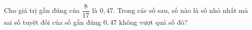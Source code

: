 \begin{ex}
Cho giá trị gần đúng của $\dfrac{8}{17}$ là $0{,}47$. Trong các số sau, số nào là số nhỏ nhất mà sai số tuyệt đối của số gần đúng $0{,}47$ không vượt quá số đó?
\end{ex}
